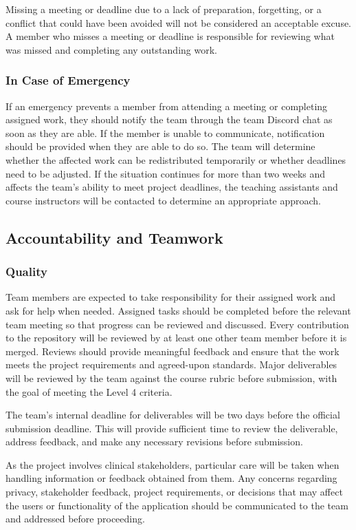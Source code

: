 \documentclass{article}
\begin{document}
Missing a meeting or deadline due to a lack of preparation, forgetting, or a conflict that
could have been avoided will not be considered an acceptable excuse. A member who misses a
meeting or deadline is responsible for reviewing what was missed and completing any outstanding work.

\subsubsection*{In Case of Emergency}

If an emergency prevents a member from attending a meeting or completing assigned work,
they should notify the team through the team Discord chat as soon as they are able. If the member
is unable to communicate, notification should be provided when they are able to do so. The
team will determine whether the affected work can be redistributed temporarily or whether
deadlines need to be adjusted. If the situation continues for more than two weeks and
affects the team's ability to meet project deadlines, the teaching assistants and course
instructors will be contacted to determine an appropriate approach.

\subsection*{Accountability and Teamwork} 

\subsubsection*{Quality}

Team members are expected to take responsibility for their assigned work and ask for help when needed.
Assigned tasks should be completed before the relevant team meeting so that progress can be reviewed
and discussed. Every contribution to the repository will be reviewed by at least one other team member
before it is merged. Reviews should provide meaningful feedback and ensure that the work meets the project
requirements and agreed-upon standards. Major deliverables will be reviewed by the team against the course
rubric before submission, with the goal of meeting the Level 4 criteria.

The team's internal deadline for deliverables will be two days before the official submission deadline.
This will provide sufficient time to review the deliverable, address feedback, and make any necessary
revisions before submission.

As the project involves clinical stakeholders, particular care will be taken when handling information
or feedback obtained from them. Any concerns regarding privacy, stakeholder feedback, project requirements,
or decisions that may affect the users or functionality of the application should be communicated to the team
and addressed before proceeding.
\end{document}
